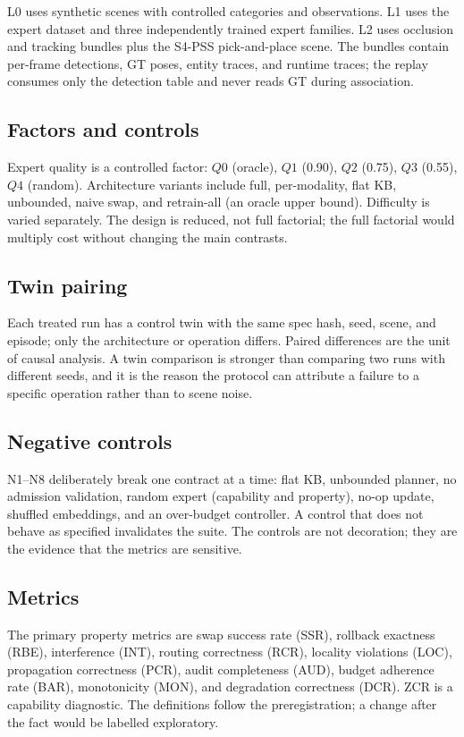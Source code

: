 \documentclass[10pt]{article}
\begin{document}
L0 uses synthetic scenes with controlled categories and observations. L1 uses
the expert dataset and three independently trained expert families. L2 uses
occlusion and tracking bundles plus the S4-PSS pick-and-place scene. The
bundles contain per-frame detections, GT poses, entity traces, and runtime
traces; the replay consumes only the detection table and never reads GT during
association.

\subsection{Factors and controls}

Expert quality is a controlled factor: $Q0$ (oracle), $Q1$ (0.90), $Q2$
(0.75), $Q3$ (0.55), $Q4$ (random). Architecture variants include full,
per-modality, flat KB, unbounded, naive swap, and retrain-all (an oracle upper
bound). Difficulty is varied separately. The design is reduced, not full
factorial; the full factorial would multiply cost without changing the main
contrasts.

\subsection{Twin pairing}

Each treated run has a control twin with the same spec hash, seed, scene, and
episode; only the architecture or operation differs. Paired differences are the
unit of causal analysis. A twin comparison is stronger than comparing two runs
with different seeds, and it is the reason the protocol can attribute a failure
to a specific operation rather than to scene noise.

\subsection{Negative controls}

N1--N8 deliberately break one contract at a time: flat KB, unbounded planner,
no admission validation, random expert (capability and property), no-op update,
shuffled embeddings, and an over-budget controller. A control that does not
behave as specified invalidates the suite. The controls are not decoration;
they are the evidence that the metrics are sensitive.

\subsection{Metrics}

The primary property metrics are swap success rate (SSR), rollback exactness
(RBE), interference (INT), routing correctness (RCR), locality violations
(LOC), propagation correctness (PCR), audit completeness (AUD), budget adherence
rate (BAR), monotonicity (MON), and degradation correctness (DCR). ZCR is a
capability diagnostic. The definitions follow the preregistration; a change
after the fact would be labelled exploratory.
\end{document}
